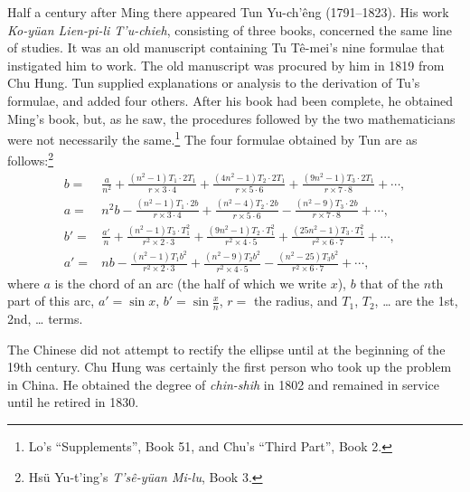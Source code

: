 \documentclass[11pt]{article}
\newcommand{\scanfooter}{}
\begin{document}
Half a century after Ming there appeared Tun Yu-ch'êng (1791--1823). His work \emph{Ko-yüan Lien-pi-li T'u-chieh}, consisting of three books, concerned the same line of studies. It was an old manuscript containing Tu Tê-mei's nine formulae that instigated him to work. The old manuscript was procured by him in 1819 from Chu Hung. Tun supplied explanations or analysis to the derivation of Tu's formulae, and added four others. After his book had been complete, he obtained Ming's book, but, as he saw, the procedures followed by the two mathematicians were not necessarily the same.\footnote{Lo's ``Supplements'', Book 51, and Chu's ``Third Part'', Book 2.} The four formulae obtained by Tun are as follows:\footnote{Hsü Yu-t'ing's \emph{T'sê-yüan Mi-lu}, Book 3.}
\[
\begin{aligned}
b={}&\frac{a}{n^2}+\frac{(n^2-1)T_1\cdot2T_1}{r\times3\cdot4}
+\frac{(4n^2-1)T_2\cdot2T_1}{r\times5\cdot6}
+\frac{(9n^2-1)T_3\cdot2T_1}{r\times7\cdot8}+\cdots,\\
a={}&n^2b-\frac{(n^2-1)T_1\cdot2b}{r\times3\cdot4}
+\frac{(n^2-4)T_2\cdot2b}{r\times5\cdot6}
-\frac{(n^2-9)T_3\cdot2b}{r\times7\cdot8}+\cdots,\\
b'={}&\frac{a'}n+\frac{(n^2-1)T_3\cdot T_1^2}{r^2\times2\cdot3}
+\frac{(9n^2-1)T_2\cdot T_1^2}{r^2\times4\cdot5}
+\frac{(25n^2-1)T_3\cdot T_1^2}{r^2\times6\cdot7}+\cdots,\\
a'={}&nb-\frac{(n^2-1)T_1b^2}{r^2\times2\cdot3}
+\frac{(n^2-9)T_2b^2}{r^2\times4\cdot5}
-\frac{(n^2-25)T_3b^2}{r^2\times6\cdot7}+\cdots,
\end{aligned}
\]
where $a$ is the chord of an arc (the half of which we write $x$), $b$ that of the $n$th part of this arc, $a'=\sin x$, $b'=\sin\frac{x}{n}$, $r=$ the radius, and $T_1$, $T_2$, \ldots{} are the 1st, 2nd, \ldots{} terms.

The Chinese did not attempt to rectify the ellipse until at the beginning of the 19th century. Chu Hung was certainly the first person who took up the problem in China. He obtained the degree of \emph{chin-shih} in 1802 and remained in service until he retired in 1830.
\scanfooter
\end{document}
